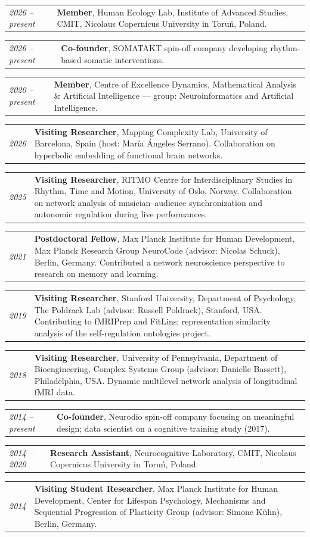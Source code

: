 \documentclass[10pt, a4paper]{article}
\makeatletter
\newcommand{\cventry}[2]{%
  \begin{tabular*}{\linewidth}{@{}p{2.8cm}@{\hspace{0.5em}}p{\dimexpr\linewidth-3.3cm}@{}}
    \textcolor{accent}{\small\itshape #1} & #2 \\[0.2em]
  \end{tabular*}%
}
\makeatother
\begin{document}
\cventry{2026 -- present}{\textbf{Member}, Human Ecology Lab, Institute of Advanced Studies, CMIT, Nicolaus Copernicus University in Toru\'n, Poland.}

\cventry{2026 -- present}{\textbf{Co-founder}, SOMATAKT spin-off company developing rhythm-based somatic interventions.}

\cventry{2020 -- present}{\textbf{Member}, Centre of Excellence Dynamics, Mathematical Analysis \& Artificial Intelligence — group: Neuroinformatics and Artificial Intelligence.}

\cventry{2026}{\textbf{Visiting Researcher}, Mapping Complexity Lab, University of Barcelona, Spain (host: Mar\'ia \'Angeles Serrano). Collaboration on hyperbolic embedding of functional brain networks.}

\cventry{2025}{\textbf{Visiting Researcher}, RITMO Centre for Interdisciplinary Studies in Rhythm, Time and Motion, University of Oslo, Norway. Collaboration on network analysis of musician--audience synchronization and autonomic regulation during live performances.}

\cventry{2021}{\textbf{Postdoctoral Fellow}, Max Planck Institute for Human Development, Max Planck Research Group NeuroCode (advisor: Nicolas Schuck), Berlin, Germany. Contributed a network neuroscience perspective to research on memory and learning.}

\cventry{2019}{\textbf{Visiting Researcher}, Stanford University, Department of Psychology, The Poldrack Lab (advisor: Russell Poldrack), Stanford, USA. Contributing to fMRIPrep and FitLins; representation similarity analysis of the self-regulation ontologies project.}

\cventry{2018}{\textbf{Visiting Researcher}, University of Pennsylvania, Department of Bioengineering, Complex Systems Group (advisor: Danielle Bassett), Philadelphia, USA. Dynamic multilevel network analysis of longitudinal fMRI data.}

\cventry{2014 -- present}{\textbf{Co-founder}, Neurodio spin-off company focusing on meaningful design; data scientist on a cognitive training study (2017).}

\cventry{2014 -- 2020}{\textbf{Research Assistant}, Neurocognitive Laboratory, CMIT, Nicolaus Copernicus University in Toru\'n, Poland.}

\cventry{2014}{\textbf{Visiting Student Researcher}, Max Planck Institute for Human Development, Center for Lifespan Psychology, Mechanisms and Sequential Progression of Plasticity Group (advisor: Simone K\"uhn), Berlin, Germany.}
\end{document}
